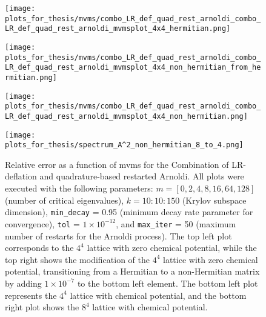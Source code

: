 \begin{figure}[H]
    \centering
    \begin{minipage}{0.45\textwidth}
        \centering
        \texttt{[image: plots\_for\_thesis/mvms/combo\_LR\_def\_quad\_rest\_arnoldi\_combo\_LR\_def\_quad\_rest\_arnoldi\_mvmsplot\_4x4\_hermitian.png]} %
    \end{minipage}%
    \hspace{0.02\textwidth} %
    \begin{minipage}{0.45\textwidth}
        \centering
        \texttt{[image: plots\_for\_thesis/mvms/combo\_LR\_def\_quad\_rest\_arnoldi\_combo\_LR\_def\_quad\_rest\_arnoldi\_mvmsplot\_4x4\_non\_hermitian\_from\_hermitian.png]} %
    \end{minipage}
    
    \vspace{0.02\textwidth} %
    
    \begin{minipage}{0.45\textwidth}
        \centering
        \texttt{[image: plots\_for\_thesis/mvms/combo\_LR\_def\_quad\_rest\_arnoldi\_combo\_LR\_def\_quad\_rest\_arnoldi\_mvmsplot\_4x4\_non\_hermitian.png]} %
    \end{minipage}%
    \hspace{0.02\textwidth} %
    \begin{minipage}{0.45\textwidth}
        \centering
        \texttt{[image: plots\_for\_thesis/spectrum\_A^2\_non\_hermitian\_8\_to\_4.png]} %
    \end{minipage}
    
    \caption{\small Relative error as a function of mvms for the Combination of LR-deflation and quadrature-based restarted Arnoldi. All plots were executed with the following parameters: $m = [0, 2, 4, 8, 16, 64, 128]$ (number of critical eigenvalues), $k = 10:10:150$ (Krylov subspace dimension), \texttt{min\_decay} = 0.95 (minimum decay rate parameter for convergence), \texttt{tol} = $1 \times 10^{-12}$, and \texttt{max\_iter} = 50 (maximum number of restarts for the Arnoldi process). The top left plot corresponds to the $4^4$ lattice with zero chemical potential, while the top right shows the modification of the $4^4$ lattice with zero chemical potential, transitioning from a Hermitian to a non-Hermitian matrix by adding $1 \times 10^{-7}$ to the bottom left element. The bottom left plot represents the $4^4$ lattice with chemical potential, and the bottom right plot shows the $8^4$ lattice with chemical potential.}
    \label{fig:combo_LR+restarted_arnoldi_mvms_plot}
\end{figure}

